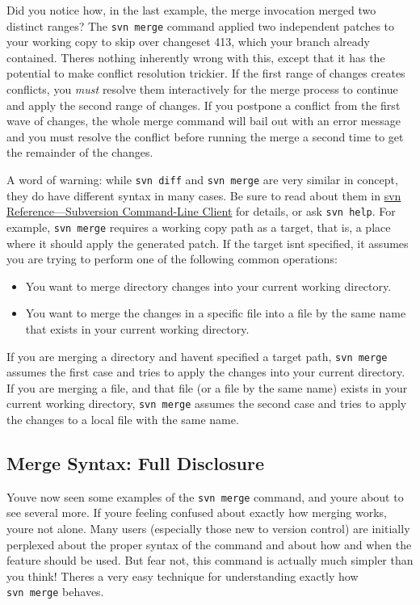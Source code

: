 Did you notice how, in the last example, the merge invocation merged two
distinct ranges? The \texttt{svn\ merge} command applied two independent
patches to your working copy to skip over changeset 413, which your
branch already contained. There\textquotesingle s nothing inherently
wrong with this, except that it has the potential to make conflict
resolution trickier. If the first range of changes creates conflicts,
you \emph{must} resolve them interactively for the merge process to
continue and apply the second range of changes. If you postpone a
conflict from the first wave of changes, the whole merge command will
bail out with an error message and you must resolve the conflict before
running the merge a second time to get the remainder of the changes.

A word of warning: while \texttt{svn\ diff} and \texttt{svn\ merge} are
very similar in concept, they do have different syntax in many cases. Be
sure to read about them in \hyperref[svn.ref.svn]{svn
Reference---Subversion Command-Line Client} for details, or ask
\texttt{svn\ help}. For example, \texttt{svn\ merge} requires a working
copy path as a target, that is, a place where it should apply the
generated patch. If the target isn\textquotesingle t specified, it
assumes you are trying to perform one of the following common
operations:

\begin{itemize}
\item
  You want to merge directory changes into your current working
  directory.
\item
  You want to merge the changes in a specific file into a file by the
  same name that exists in your current working directory.
\end{itemize}

If you are merging a directory and haven\textquotesingle t specified a
target path, \texttt{svn\ merge} assumes the first case and tries to
apply the changes into your current directory. If you are merging a
file, and that file (or a file by the same name) exists in your current
working directory, \texttt{svn\ merge} assumes the second case and tries
to apply the changes to a local file with the same name.

\subsection{Merge Syntax: Full
Disclosure}\label{svn.branchmerge.advanced.advancedsyntax}

You\textquotesingle ve now seen some examples of the \texttt{svn\ merge}
command, and you\textquotesingle re about to see several more. If
you\textquotesingle re feeling confused about exactly how merging works,
you\textquotesingle re not alone. Many users (especially those new to
version control) are initially perplexed about the proper syntax of the
command and about how and when the feature should be used. But fear not,
this command is actually much simpler than you think!
There\textquotesingle s a very easy technique for understanding exactly
how \texttt{svn\ merge} behaves.

